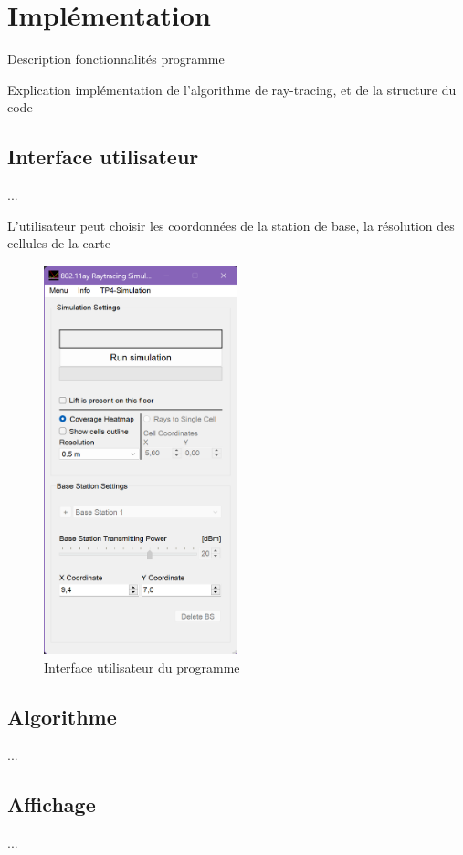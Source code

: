 \chapter{Implémentation}
\label{chaper-2}

Description fonctionnalités programme

Explication implémentation de l'algorithme de ray-tracing, et de la structure du code


\section{Interface utilisateur}
...

L'utilisateur peut choisir les coordonnées de la station de base, la résolution des cellules de la carte

\begin{figure}[H]
    \centering
    \includegraphics[width=0.5\textwidth]{latex/images/interface.png}
    \caption{Interface utilisateur du programme}
    \label{fig:interface}
\end{figure}

\section{Algorithme}
...

\section{Affichage}
...

